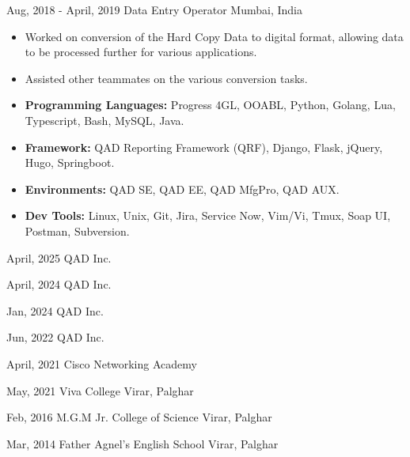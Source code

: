 \documentclass{curriculum-vitae}
\begin{document}
{Aug, 2018 - April, 2019}
{Data Entry Operator}
{Mumbai, India}

\begin{itemize}
   \item Worked on conversion of the Hard Copy Data to digital format, allowing
      data to be processed further for various applications.
   \item Assisted other teammates on the various conversion tasks.
\end{itemize}


\begin{itemize}
   \item \textbf{Programming Languages:} Progress 4GL, OOABL, Python, Golang, Lua, Typescript, Bash, MySQL, Java.
   \item \textbf{Framework:} QAD Reporting Framework (QRF), Django, Flask, jQuery, Hugo, Springboot.
   \item \textbf{Environments:} QAD SE, QAD EE, QAD MfgPro, QAD AUX.
   \item \textbf{Dev Tools:} Linux, Unix, Git, Jira, Service Now, Vim/Vi, Tmux, Soap UI, Postman, Subversion.
\end{itemize}


{April, 2025}
{QAD Inc.}
{}

{April, 2024}
{QAD Inc.}
{}

{Jan, 2024}
{QAD Inc.}
{}

{Jun, 2022}
{QAD Inc.}
{}

{April, 2021}
{Cisco Networking Academy}
{}


{May, 2021}
{Viva College}
{Virar, Palghar}

{Feb, 2016}
{M.G.M Jr. College of Science}
{Virar, Palghar}

{Mar, 2014}
{Father Agnel's English School}
{Virar, Palghar}
\end{document}
